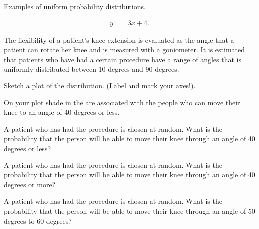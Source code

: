 


\begin{problem}
\item Examples of uniform probability distributions.

  \begin{subproblem}
  \item 
    \begin{eqnarray}
      y & = 3x + 4.
    \end{eqnarray}
    \vfill
  \end{subproblem}


\end{problem}



\begin{problem}

\item The flexibility of a patient's knee extension is evaluated as
  the angle that a patient can rotate her knee and is measured with a
  goniometer. It is estimated that patients who have had a certain
  procedure have a range of angles that is uniformly distributed
  between 10 degrees and 90 degrees.

  \begin{subproblem}
    \item Sketch a plot of the distribution. (Label and mark your
      axes!).

      \vfill

    \item On your plot shade in the are associated with the people
      who can move their knee to an angle of 40 degrees or less.
      
    \item A patient who has had the procedure is chosen at
      random. What is the probability that the person will be able to
      move their knee through an angle of 40 degrees or less?

      \vspace{2em}

    \item A patient who has had the procedure is chosen at
      random. What is the probability that the person will be able to
      move their knee through an angle of 40 degrees or more?

      \vspace{2em}

    \item A patient who has had the procedure is chosen at
      random. What is the probability that the person will be able to
      move their knee through an angle of 50 degrees to 60 degrees?


\end{subproblem}
\end{problem}
